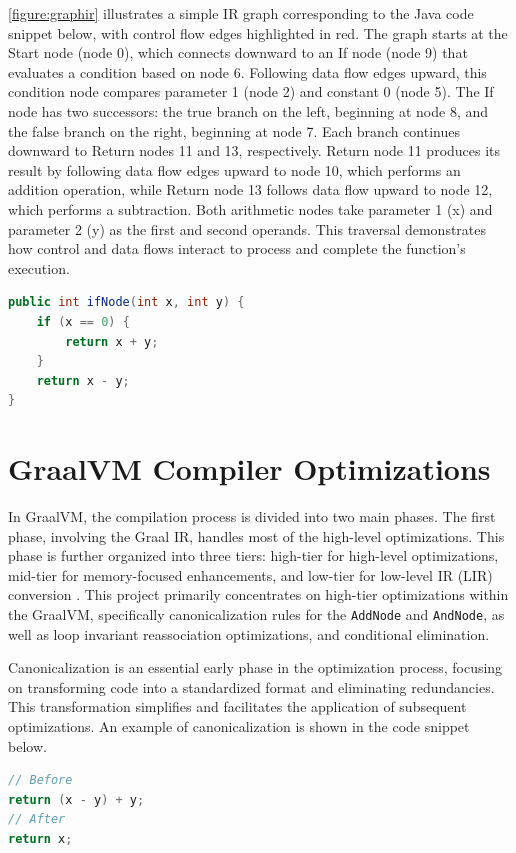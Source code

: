 \autoref{figure:graphir} illustrates a simple IR graph corresponding to the Java code snippet below, with control flow edges highlighted in red. The graph starts at the Start node (node 0), which connects downward to an If node (node 9) that evaluates a condition based on node 6. Following data flow edges upward, this condition node compares parameter 1 (node 2) and constant 0 (node 5). The If node has two successors: the true branch on the left, beginning at node 8, and the false branch on the right, beginning at node 7. Each branch continues downward to Return nodes 11 and 13, respectively. Return node 11 produces its result by following data flow edges upward to node 10, which performs an addition operation, while Return node 13 follows data flow upward to node 12, which performs a subtraction. Both arithmetic nodes take parameter 1 (x) and parameter 2 (y) as the first and second operands. This traversal demonstrates how control and data flows interact to process and complete the function's execution.

\begin{lstlisting}[language=Java]
public int ifNode(int x, int y) {
    if (x == 0) {
        return x + y;
    }
    return x - y;
}
\end{lstlisting}


\section{GraalVM Compiler Optimizations}

In GraalVM, the compilation process is divided into two main phases. The first phase, involving the Graal IR, handles most of the high-level optimizations. This phase is further organized into three tiers: high-tier for high-level optimizations, mid-tier for memory-focused enhancements, and low-tier for low-level IR (LIR) conversion \cite{Graal2021}. This project primarily concentrates on high-tier optimizations within the GraalVM, specifically canonicalization rules for the \texttt{AddNode} and \texttt{AndNode}, as well as loop invariant reassociation optimizations, and conditional elimination.

Canonicalization is an essential early phase in the optimization process, focusing on transforming code into a standardized format and eliminating redundancies. This transformation simplifies and facilitates the application of subsequent optimizations. 
An example of canonicalization is shown in the code snippet below.
\begin{lstlisting}[language=Java]
// Before
return (x - y) + y;
// After
return x;
\end{lstlisting}

